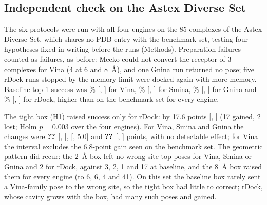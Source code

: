 \subsection{Independent check on the Astex Diverse Set}
\label{sec:astex}

The six protocols were run with all four engines on the 85 complexes of the Astex Diverse Set,
which shares no PDB entry with the benchmark set, testing four hypotheses fixed in writing
before the runs (Methods). Preparation failures counted as failures, as before: Meeko could not
convert the receptor of 3 complexes for Vina (4 at 6 and \SI{8}{\angstrom}), and one Gnina run
returned no pose; five rDock runs stopped by the memory limit were docked again with more
memory. Baseline top-1 success was \% [, ] for Vina, \% [, ] for
Smina, \% [, ] for Gnina and \% [, ] for rDock, higher than on the
benchmark set for every engine.

The tight box (H1) raised success only for rDock: by 17.6 points [, ] (17 gained, 2
lost; Holm $p = 0.003$ over the four engines). For Vina, Smina and Gnina the changes were
$\val{astex_h1/vina/diff_pts}$ [, ],  [, 5.0] and $\val{astex_h1/gnina/diff_pts}$ [, ] points, with no detectable
effect; for Vina the interval excludes the 6.8-point gain seen on the benchmark set. The
geometric pattern did recur: the \SI{2}{\angstrom} box left no wrong-site top poses for Vina,
Smina or Gnina and 2 for rDock, against 3, 2, 1 and 17 at baseline, and the
\SI{8}{\angstrom} box raised them for every engine (to 6, 6, 4 and 41). On this set the
baseline box rarely sent a Vina-family pose to the wrong site, so the tight box had little to
correct; rDock, whose cavity grows with the box, had many such poses and gained.

